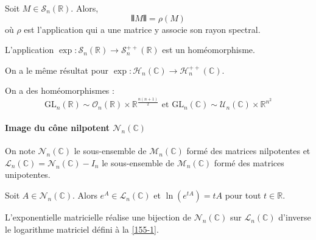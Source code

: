   \begin{lemma}
    Soit $M \in \mathcal{S}_n(\mathbb{R})$. Alors,
    \[ \VERT M \VERT = \rho(M) \]
    où $\rho$ est l'application qui a une matrice y associe son rayon spectral.
  \end{lemma}


  \begin{theorem}
    L'application $\exp : \mathcal{S}_n(\mathbb{R}) \rightarrow \mathcal{S}^{++}_n(\mathbb{R})$ est un homéomorphisme.
  \end{theorem}


  \begin{remark}
    On a le même résultat pour $\exp : \mathcal{H}_n(\mathbb{C}) \rightarrow \mathcal{H}^{++}_n(\mathbb{C})$.
  \end{remark}

  \begin{application}
    On a des homéomorphismes :
    \[ \mathrm{GL}_n(\mathbb{R}) \sim \mathcal{O}_n(\mathbb{R}) \times \mathbb{R}^{\frac{n(n+1)}{2}} \text{ et } \mathrm{GL}_n(\mathbb{C}) \sim \mathcal{U}_n(\mathbb{C}) \times \mathbb{R}^{n^2} \]
  \end{application}

  \paragraph{Image du cône nilpotent $\mathcal{N}_n(\mathbb{C})$}


  \begin{notation}
    On note $\mathcal{N}_n(\mathbb{C})$ le sous-ensemble de $\mathcal{M}_n(\mathbb{C})$ formé des matrices nilpotentes et $\mathcal{L}_n(\mathbb{C}) = \mathcal{N}_n(\mathbb{C}) - I_n$ le sous-ensemble de $\mathcal{M}_n(\mathbb{C})$ formé des matrices unipotentes.
  \end{notation}

  \begin{proposition}
    Soit $A \in \mathcal{N}_n(\mathbb{C})$. Alors $e^A \in \mathcal{L}_n(\mathbb{C})$ et $\ln(e^{tA}) = tA$ pour tout $t \in \mathbb{R}$.
  \end{proposition}

  \begin{theorem}
    L'exponentielle matricielle réalise une bijection de $\mathcal{N}_n(\mathbb{C})$ sur $\mathcal{L}_n(\mathbb{C})$ d'inverse le logarithme matriciel défini à la \cref{155-1}.
  \end{theorem}

